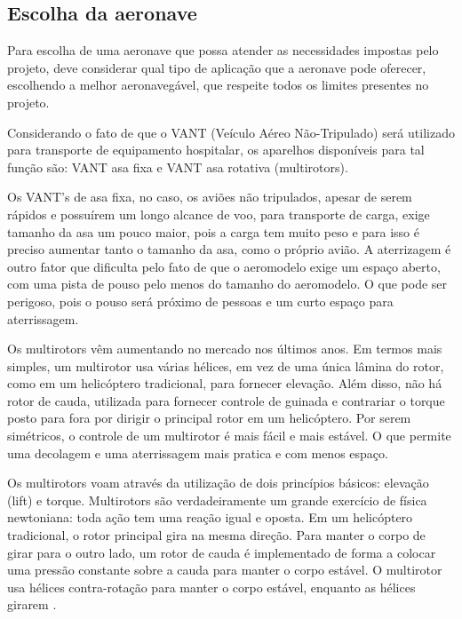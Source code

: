 \subsection{Escolha da aeronave}

Para escolha de uma aeronave que possa atender as necessidades impostas pelo projeto, deve considerar qual tipo de aplicação que a aeronave pode oferecer, escolhendo a melhor aeronavegável, que respeite todos os limites presentes no projeto. 

Considerando o fato de que o VANT (Veículo Aéreo Não-Tripulado) será utilizado para transporte de equipamento hospitalar, os aparelhos disponíveis para tal função são: VANT asa fixa e VANT asa rotativa (multirotors).

Os VANT’s de asa fixa, no caso, os aviões não tripulados, apesar de serem rápidos e possuírem um longo alcance de voo, para transporte de carga, exige tamanho da asa um pouco maior, pois a carga tem muito peso e para isso é preciso aumentar tanto o tamanho da asa, como o próprio avião. A aterrizagem é outro fator que dificulta pelo fato de que o aeromodelo exige um espaço aberto, com uma pista de pouso pelo menos do tamanho do aeromodelo. O que pode ser perigoso, pois o pouso será próximo de pessoas e um curto espaço para aterrissagem.

Os multirotors vêm aumentando no mercado nos últimos anos. Em termos mais simples, um multirotor usa várias hélices, em vez de uma única lâmina do rotor, como em um helicóptero tradicional, para fornecer elevação. Além disso, não há rotor de cauda, utilizada para fornecer controle de guinada e contrariar o torque posto para fora por dirigir o principal rotor em um helicóptero. Por serem simétricos, o controle de um multirotor é mais fácil e mais estável. O que permite uma decolagem e uma aterrissagem mais pratica e com menos espaço.
  
Os multirotors voam através da utilização de dois princípios básicos: elevação (lift) e torque.  Multirotors são verdadeiramente um grande exercício de física newtoniana: toda ação tem uma reação igual e oposta. Em um helicóptero tradicional, o rotor principal gira na mesma direção. Para manter o corpo de girar para o outro lado, um rotor de cauda é implementado de forma a colocar uma pressão constante sobre a cauda para manter o corpo estável. O multirotor usa hélices contra-rotação para manter o corpo estável, enquanto as hélices girarem \cite{audronis}.


